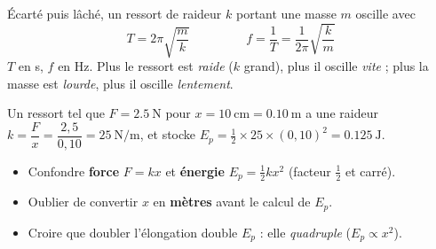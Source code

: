 \documentclass[11pt,a4paper]{article}
\begin{document}
\begin{cle}
Écarté puis lâché, un ressort de raideur $k$ portant une masse $m$ oscille avec
\[
\boxed{\;T=2\pi\sqrt{\dfrac{m}{k}}\;}\qquad\qquad\boxed{\;f=\dfrac1T=\dfrac{1}{2\pi}\sqrt{\dfrac{k}{m}}\;}
\]
$T$ en \si{\second}, $f$ en \si{\hertz}. Plus le ressort est \emph{raide} ($k$ grand), plus il oscille
\emph{vite} ; plus la masse est \emph{lourde}, plus il oscille \emph{lentement}.
\end{cle}

\begin{exemplebox}
Un ressort tel que $F=\qty{2,5}{\newton}$ pour $x=\qty{10}{\centi\metre}=\qty{0,10}{\metre}$ a une raideur
$k=\dfrac{F}{x}=\dfrac{2,5}{0,10}=\qty{25}{\newton\per\metre}$, et stocke
$E_p=\tfrac12\times25\times(0,10)^2=\qty{0,125}{\joule}$.
\end{exemplebox}

\begin{piege}
\begin{itemize}[leftmargin=1.5em,topsep=1pt,itemsep=1pt]
  \item Confondre \textbf{force} $F=kx$ et \textbf{énergie} $E_p=\tfrac12 kx^2$ (facteur $\tfrac12$ et carré).
  \item Oublier de convertir $x$ en \textbf{mètres} avant le calcul de $E_p$.
  \item Croire que doubler l'élongation double $E_p$ : elle \emph{quadruple} ($E_p\propto x^2$).
\end{itemize}
\end{piege}
\end{document}
